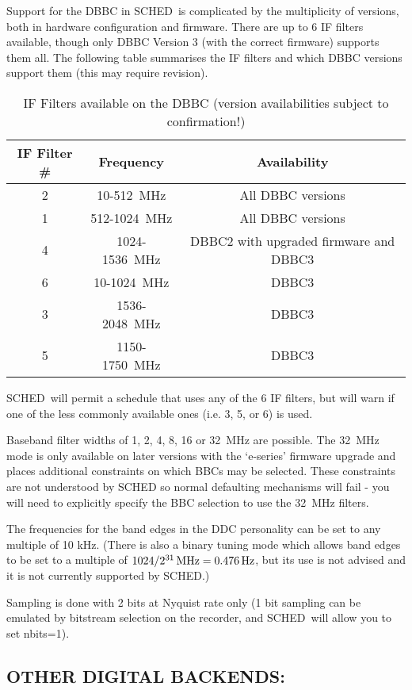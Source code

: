 \documentclass{report}
\newcommand{\sched}{{\sc SCHED}}
\newcommand{\schedb}{{\sc SCHED~}}
\begin{document}
Support for the DBBC in \schedb is complicated by the multiplicity of versions, both in hardware configuration and firmware. There are up to 6 IF filters available, though only DBBC Version 3 (with the correct firmware) supports them all. The following table summarises the IF filters and which DBBC versions support them (this may require revision).
\begin{table}[here]
\begin{tabular}{|c|c|c|}
IF Filter \# & Frequency     & Availability \\
    \hline
2        & 10-512~MHz    & All DBBC versions \\
    1    & 512-1024~MHz  & All DBBC versions \\
    4    & 1024-1536~MHz & DBBC2 with upgraded firmware and DBBC3  \\
    6    & 10-1024~MHz   & DBBC3 \\
    3    & 1536-2048~MHz   & DBBC3 \\
    5    & 1150-1750~MHz   & DBBC3 \\
\end{tabular}
\caption{IF Filters available on the DBBC (version availabilities subject to confirmation!)}
\end{table}

\schedb will permit a schedule that uses any of the 6 IF filters, but will warn if one of the less commonly available ones (i.e. 3, 5, or 6) is used. 

Baseband filter widths of 1, 2, 4, 8, 16 or 32~MHz are possible. The 32~MHz
mode is only available on later versions with the `e-series' firmware upgrade
and places additional constraints on which BBCs may be selected. These
constraints are not understood by SCHED so normal defaulting mechanisms will
fail - you will need to explicitly specify the BBC selection to use the 32~MHz filters.

The frequencies for the band edges in the DDC personality can be set to any
multiple of 10 kHz. (There is also a binary tuning mode which allows band edges
to be set to a multiple of $1024/2^{31} \,{\rm MHz} = 0.476 \,{\rm Hz}$, but
its use is not advised and it is not currently supported by \sched.)

Sampling is done with 2 bits at Nyquist rate only (1 bit sampling can be
emulated by bitstream selection on the recorder, and \schedb will allow you to
set nbits=1).



\subsection{\label{SSEC:OTHERREC}OTHER DIGITAL BACKENDS:}
\end{document}
